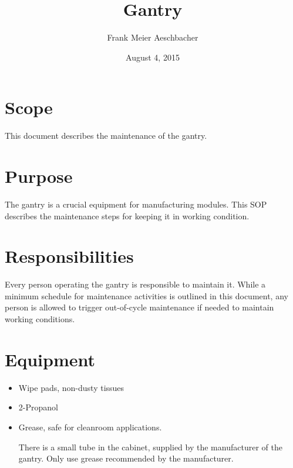 \documentclass[12pt]{unlsilabsop}
\title{Gantry}
\date{August 4, 2015}
\author{Frank Meier Aeschbacher}
\begin{document}
\maketitle

\section{Scope}
This document describes the maintenance of the gantry.

\section{Purpose}
The gantry is a crucial equipment for manufacturing modules. This SOP describes the maintenance steps for keeping it in working condition.


\section{Responsibilities}
Every person operating the gantry is responsible to maintain it. While a minimum schedule for maintenance activities is outlined in this document, any person is allowed to trigger out-of-cycle maintenance if needed to maintain working conditions.

\section{Equipment}

\begin{itemize}
    \item Wipe pads, non-dusty tissues
    \item 2-Propanol
    \item Grease, safe for cleanroom applications.

    There is a small tube in the cabinet, supplied by the manufacturer of the gantry. Only use grease recommended by the manufacturer.
\end{itemize}
\end{document}

